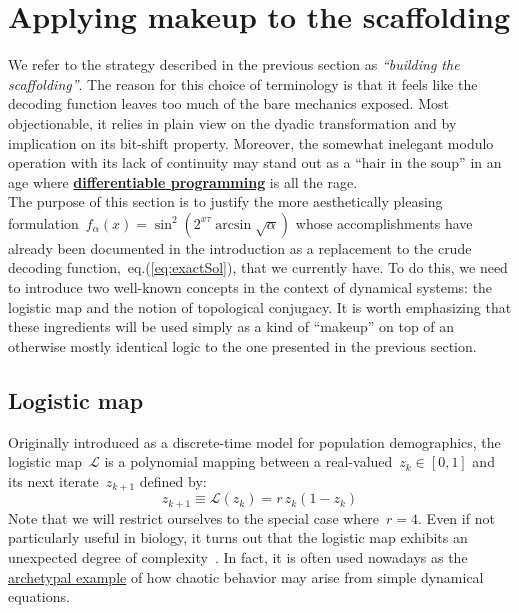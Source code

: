 \documentclass{article}
\begin{document}
\newpage

\section{Applying makeup to the scaffolding}
\label{secondStrategy}

We refer to the strategy described in the previous section as {\it ``building the scaffolding''}.  The reason for this choice of terminology is that it feels like the decoding function leaves too much of the bare mechanics exposed.  Most objectionable, it relies in plain view on the dyadic transformation and by implication on its bit-shift property.  Moreover, the somewhat inelegant modulo operation with its lack of continuity may stand out as a ``hair in the soup'' in an age where \href{https://en.wikipedia.org/wiki/Differentiable\_programming}{\bf differentiable programming} is all the rage. \\

\noindent The purpose of this section is to justify the more aesthetically pleasing formulation~$f_\alpha(x) = \sin^2 (2^{x\tau} \arcsin{\sqrt{\alpha}})$ whose accomplishments have already been documented in the introduction as a replacement to the crude decoding function,~eq.(\ref{eq:exactSol}), that we currently have.  To do this, we need to introduce two well-known concepts in the context of dynamical systems: the logistic map and the notion of topological conjugacy.  It is worth emphasizing that these ingredients will be used simply as a kind of ``makeup'' on top of an otherwise mostly identical logic to the one presented in the previous section.

\subsection{Logistic map}

Originally introduced as a discrete-time model for population demographics, the logistic map~$\mathcal{L}$ is a polynomial mapping between a real-valued~$z_k \in [0,1]$ and its next iterate~$z_{k+1}$ defined by:
\begin{equation}
z_{k+1} \equiv \mathcal{L} (z_k) = r \, z_k (1 - z_k)
\label{eq:logisiticMap}
\end{equation}
Note that we will restrict ourselves to the special case where~$r=4$.  Even if not particularly useful in biology, it turns out that the logistic map exhibits an unexpected degree of complexity~\cite{robertMay}.  In fact, it is often used nowadays as the \href{https://en.wikipedia.org/wiki/Logistic\_map}{archetypal example} of how chaotic behavior may arise from simple dynamical equations. \\
\end{document}

